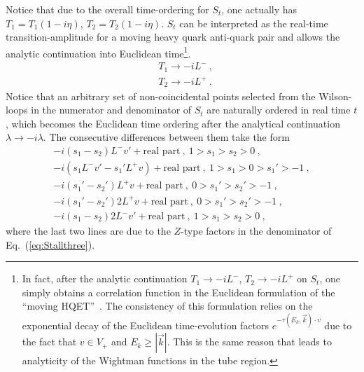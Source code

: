 \documentclass[a4paper,11pt]{article}
\begin{document}
Notice that due to the overall time-ordering for $S_t$, one actually has $T_1=T_1(1-i\eta)$, $T_2=T_2(1-i\eta)$. $S_t$ can be interpreted as the real-time transition-amplitude for a moving heavy quark anti-quark pair and allows the analytic continuation into Euclidean time\footnote{In fact, after the analytic continuation $T_1 \rightarrow -iL^-$, $T_2 \rightarrow -iL^+$ on $S_t$, one simply obtains a correlation function in the Euclidean formulation of the ``moving HQET''~\cite{Aglietti:1993hf,Hashimoto:1995in,Horgan:2009ti}. The consistency of this formulation relies on the exponential decay of the Euclidean time-evolution factors $e^{-\tau (E_k,\vec{k})\cdot v}$ due to the fact that $v \in V_+$ and $E_k \ge |\vec{k}|$. This is the same reason that leads to analyticity of the Wightman functions in the tube region.}.
\begin{align}
&T_1\rightarrow -iL^-  \ , \\
&T_2 \rightarrow -iL^+ \ .
\end{align}
Notice that an arbitrary set of non-coincidental points selected from the Wilson-loops in the numerator and denominator of $S_t$ are naturally ordered in real time $t$, which becomes the Euclidean time ordering after the analytical continuation $\lambda \rightarrow -i\lambda$. The consecutive differences between them take the form
\begin{align}
-i(s_1-s_2)L^-v'+\text{real part} \ , \  1>s_1>s_2>0 \ , \\
-i(s_1 L^- v' -s_1'L^+v)+\text{real part} \ , \ 1>s_1>0>s_1'>-1 \ , \\
-i(s_1'-s_2')L^+v+\text{real part} \ , \ 0>s_1'>s_2'>-1 \ , \\
-i(s_1'-s_2')2L^+v+\text{real part} \ , \ 0>s_1'>s_2'>-1 \ , \\ 
-i(s_1-s_2)2L^-v'+\text{real part} \ , \  1>s_1>s_2>0 \ , 
\end{align}
where the last two lines are due to the $Z$-type factors in the denominator of Eq.~(\ref{eq:Stallthree}). 
\end{document}
